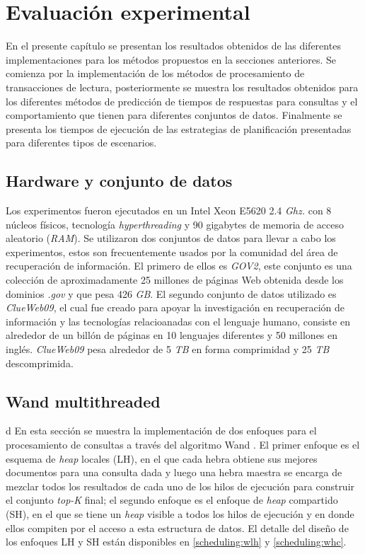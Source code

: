 \chapter{Evaluación experimental}
\label{cap:evaluacionexperimental}
En el presente capítulo se presentan los resultados obtenidos de las diferentes implementaciones para los métodos propuestos en la secciones anteriores. Se comienza por la implementación de los métodos de procesamiento de transacciones de lectura, posteriormente se muestra los resultados obtenidos para los diferentes métodos de predicción de tiempos de respuestas para consultas y el comportamiento que tienen para diferentes conjuntos de datos. Finalmente se presenta los tiempos de ejecución de las estrategias de planificación presentadas para diferentes tipos de escenarios.

\section{Hardware y conjunto de datos}
\label{evaluacionexperimental:hardwareydatos}
Los experimentos fueron ejecutados en un Intel Xeon E5620 2.4 \textit{Ghz.} con 8 núcleos físicos, tecnología \textit{hyperthreading} y 90 gigabytes de memoria de acceso aleatorio (\textit{RAM}). Se utilizaron dos conjuntos de datos para llevar a cabo los experimentos, estos son frecuentemente usados por la comunidad del área de recuperación de información. El primero de ellos es \textit{GOV2}, este conjunto es una colección de aproximadamente 25 millones de páginas Web obtenida desde los dominios \textit{.gov} y que pesa 426 \textit{GB}. El segundo conjunto de datos utilizado es \textit{ClueWeb09}, el cual fue creado para apoyar la investigación en recuperación de información y las tecnologías relacioanadas con el lenguaje humano, consiste en alrededor de un billón de páginas en 10 lenguajes diferentes y 50 millones en inglés. \textit{ClueWeb09} pesa alrededor de 5 \textit{TB} en forma comprimidad y 25 \textit{TB} descomprimida. 

\section{Wand multithreaded}d
\label{evaluacionexperimental:wm}
En esta sección se muestra la implementación de dos enfoques para el procesamiento de consultas a través del algoritmo Wand \citep{Broder:2003}. El primer enfoque es el esquema de \textit{heap} locales (LH), en el que cada hebra obtiene sus mejores documentos para una consulta dada y luego una hebra maestra se encarga de mezclar todos los resultados de cada uno de los hilos de ejecución para construir el conjunto \textit{top-K} final; el segundo enfoque es el enfoque de \textit{heap} compartido (SH), en el que se tiene un \textit{heap} visible a todos los hilos de ejecución y en donde ellos compiten por el acceso a esta estructura de datos. El detalle del diseño de los enfoques LH y SH están disponibles en \ref{scheduling:wlh} y \ref{scheduling:whc}. 

